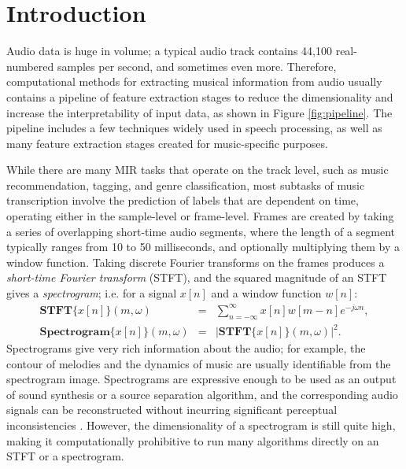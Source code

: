 \section{Introduction}

Audio data is huge in volume; a typical audio track contains 44,100 real-numbered samples per second, and sometimes even more.
Therefore, computational methods for extracting musical information from audio usually contains a pipeline of feature extraction stages to reduce the dimensionality and increase the interpretability of input data, as shown in Figure \ref{fig:pipeline}.
The pipeline includes a few techniques widely used in speech processing, as well as many feature extraction stages created for music-specific purposes.


While there are many MIR tasks that operate on the track level, such as music recommendation, tagging, and genre classification, most subtasks of music transcription involve the prediction of labels that are dependent on time, operating either in the sample-level or frame-level.
Frames are created by taking a series of overlapping short-time audio segments, where the length of a segment typically ranges from 10 to 50 milliseconds, and optionally multiplying them by a window function.
Taking discrete Fourier transforms on the frames produces a \emph{short-time Fourier transform} (STFT), and the squared magnitude of an STFT gives a \emph{spectrogram}; 
i.e. for a signal $x[n]$ and a window function $w[n]$:
\begin{eqnarray}
\textbf{STFT}\{x[n]\}(m, \omega) & = & \sum_{n = -\infty}^{\infty} x[n] w[m-n] e^{-j \omega n}, \\
\textbf{Spectrogram}\{x[n]\}(m, \omega) & = & \big | \textbf{STFT}\{x[n]\}(m, \omega) \big |^2.
\end{eqnarray}
Spectrograms give very rich information about the audio; for example, the contour of melodies and the dynamics of music are usually identifiable from the spectrogram image.
Spectrograms are expressive enough to be used as an output of sound synthesis or a source separation algorithm, and the corresponding audio signals can be reconstructed without incurring significant perceptual inconsistencies \cite{griffin1984lim, leroux2010spectrogram}.
However, the dimensionality of a spectrogram is still quite high, making it computationally prohibitive to run many algorithms directly on an STFT or a spectrogram.

